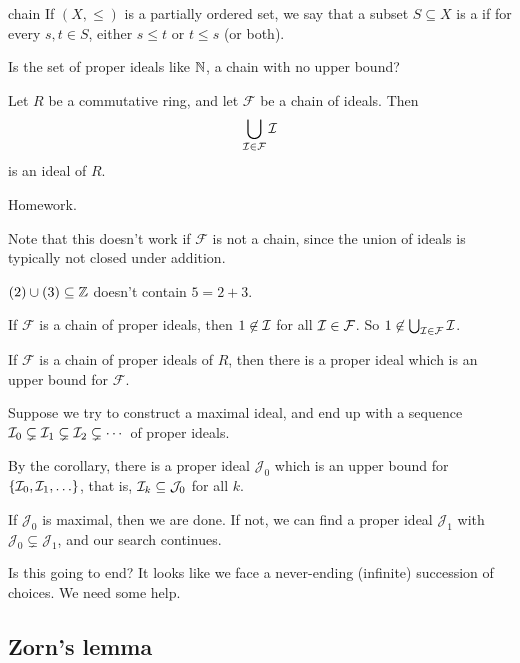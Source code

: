 \documentclass[12pt,letterpaper]{report}
\begin{document}
\begin{defn}{chain}{}
  If $(X, \leq)$ is a partially ordered set, we say that a subset $S \subseteq X$ is a 
  if for every $s, t \in S$, either $s \leq t$ or $t \leq s$ (or both).
\end{defn}

Is the set of proper ideals like $\mathbb{N}$, a chain with no upper bound?

\begin{lem}{}{}
  Let $R$ be a commutative ring, and let $\mathcal{F}$ be a chain of ideals.
  Then
  \[ \bigcup_{\mathcal{I} \in \mathcal{F}} \mathcal{I} \]
  is an ideal of $R$.
\end{lem}

\begin{thmproof}
  Homework.
\end{thmproof}

Note that this doesn't work if $\mathcal{F}$ is not a chain, since the union of ideals is typically
not closed under addition.

\begin{ex}
  $(2) \cup (3) \subseteq \mathbb{Z}$ doesn't contain $5 = 2 + 3$.
\end{ex}

If $\mathcal{F}$ is a chain of proper ideals, then $1 \not\in \mathcal{I}$ for all
$\mathcal{I} \in \mathcal{F}$.
So $1 \not\in \bigcup_{\mathcal{I} \in \mathcal{F}} \mathcal{I}$.

\begin{cor}{}{}
  If $\mathcal{F}$ is a chain of proper ideals of $R$, then there is a proper ideal which is an
  upper bound for $\mathcal{F}$.
\end{cor}

Suppose we try to construct a maximal ideal, and end up with a sequence
$\mathcal{I}_0 \subsetneq \mathcal{I}_1 \subsetneq \mathcal{I}_2 \subsetneq \cdots$ of proper ideals.

By the corollary, there is a proper ideal $\mathcal{J}_0$ which is an upper bound for
$\{\mathcal{I}_0, \mathcal{I}_1, \ldots\}$, that is, $\mathcal{I}_k \subseteq \mathcal{J}_0$ for all $k$.

If $\mathcal{J}_0$ is maximal, then we are done.
If not, we can find a proper ideal $\mathcal{J}_1$ with $\mathcal{J}_0 \subsetneq \mathcal{J}_1$,
and our search continues.

Is this going to end?
It looks like we face a never-ending (infinite) succession of choices.
We need some help.

\pagebreak
\subsection{Zorn's lemma}
\end{document}
